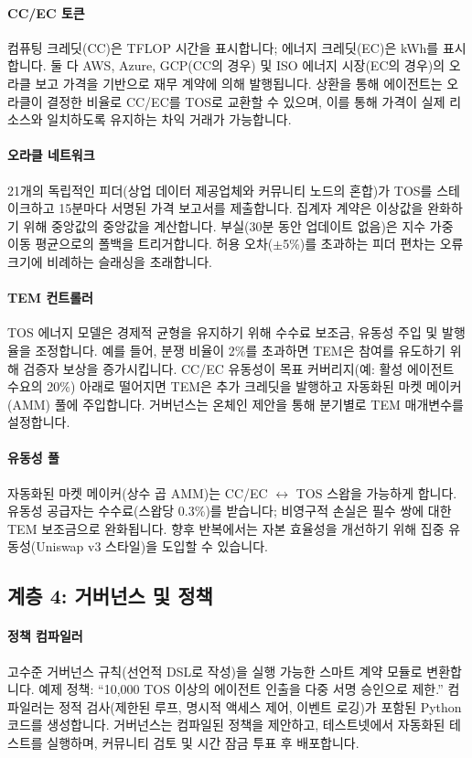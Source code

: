 \documentclass[11pt]{article}
\begin{document}
\paragraph{CC/EC 토큰} 컴퓨팅 크레딧(CC)은 TFLOP 시간을 표시합니다; 에너지 크레딧(EC)은 kWh를 표시합니다. 둘 다 AWS, Azure, GCP(CC의 경우) 및 ISO 에너지 시장(EC의 경우)의 오라클 보고 가격을 기반으로 재무 계약에 의해 발행됩니다. 상환을 통해 에이전트는 오라클이 결정한 비율로 CC/EC를 TOS로 교환할 수 있으며, 이를 통해 가격이 실제 리소스와 일치하도록 유지하는 차익 거래가 가능합니다.

\paragraph{오라클 네트워크} 21개의 독립적인 피더(상업 데이터 제공업체와 커뮤니티 노드의 혼합)가 TOS를 스테이크하고 15분마다 서명된 가격 보고서를 제출합니다. 집계자 계약은 이상값을 완화하기 위해 중앙값의 중앙값을 계산합니다. 부실(30분 동안 업데이트 없음)은 지수 가중 이동 평균으로의 폴백을 트리거합니다. 허용 오차($\pm$5\%)를 초과하는 피더 편차는 오류 크기에 비례하는 슬래싱을 초래합니다.

\paragraph{TEM 컨트롤러} TOS 에너지 모델은 경제적 균형을 유지하기 위해 수수료 보조금, 유동성 주입 및 발행율을 조정합니다. 예를 들어, 분쟁 비율이 2\%를 초과하면 TEM은 참여를 유도하기 위해 검증자 보상을 증가시킵니다. CC/EC 유동성이 목표 커버리지(예: 활성 에이전트 수요의 20\%) 아래로 떨어지면 TEM은 추가 크레딧을 발행하고 자동화된 마켓 메이커(AMM) 풀에 주입합니다. 거버넌스는 온체인 제안을 통해 분기별로 TEM 매개변수를 설정합니다.

\paragraph{유동성 풀} 자동화된 마켓 메이커(상수 곱 AMM)는 CC/EC $\leftrightarrow$ TOS 스왑을 가능하게 합니다. 유동성 공급자는 수수료(스왑당 0.3\%)를 받습니다; 비영구적 손실은 필수 쌍에 대한 TEM 보조금으로 완화됩니다. 향후 반복에서는 자본 효율성을 개선하기 위해 집중 유동성(Uniswap v3 스타일)을 도입할 수 있습니다.

\subsection{계층 4: 거버넌스 및 정책}
\paragraph{정책 컴파일러} 고수준 거버넌스 규칙(선언적 DSL로 작성)을 실행 가능한 스마트 계약 모듈로 변환합니다. 예제 정책: ``10,000 TOS 이상의 에이전트 인출을 다중 서명 승인으로 제한.'' 컴파일러는 정적 검사(제한된 루프, 명시적 액세스 제어, 이벤트 로깅)가 포함된 Python 코드를 생성합니다. 거버넌스는 컴파일된 정책을 제안하고, 테스트넷에서 자동화된 테스트를 실행하며, 커뮤니티 검토 및 시간 잠금 투표 후 배포합니다.
\end{document}
